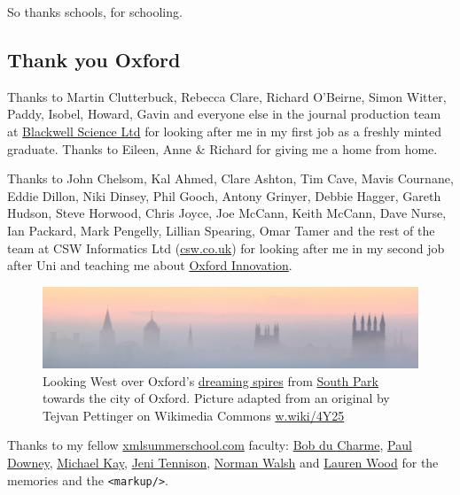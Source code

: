 \documentclass[
]{book}
\begin{document}
So thanks schools, for schooling. 🙏

\hypertarget{oxford}{%
\subsection{Thank you Oxford}\label{oxford}}

Thanks to Martin Clutterbuck, Rebecca Clare, Richard O'Beirne, Simon Witter, Paddy, Isobel, Howard, Gavin and everyone else in the journal production team at \href{https://www.flickr.com/photos/dullhunk/4042838703}{Blackwell Science Ltd} for looking after me in my first job as a freshly minted graduate. Thanks to Eileen, Anne \& Richard for giving me a home from home.

Thanks to John Chelsom, Kal Ahmed, Clare Ashton, Tim Cave, Mavis Cournane, Eddie Dillon, Niki Dinsey, Phil Gooch, Antony Grinyer, Debbie Hagger, Gareth Hudson, Steve Horwood, Chris Joyce, Joe McCann, Keith McCann, Dave Nurse, Ian Packard, Mark Pengelly, Lillian Spearing, Omar Tamer and the rest of the team at CSW Informatics Ltd (\href{https://csw.co.uk/}{csw.co.uk}) for looking after me in my second job after Uni and teaching me about \href{https://oxin-centres.co.uk/}{Oxford Innovation}.

\begin{figure}

{\centering \includegraphics[width=1\linewidth]{images/dreaming-spires-oxford-sunrise} 

}

\caption{Looking West over Oxford's \href{https://en.wikipedia.org/wiki/Thyrsis_(poem)}{dreaming spires} from \href{https://en.wikipedia.org/wiki/South_Park,_Oxford}{South Park} towards the city of Oxford. Picture adapted from an original by Tejvan Pettinger on Wikimedia Commons \href{https://w.wiki/4Y25}{w.wiki/4Y25}}\label{fig:oxford-fig}
\end{figure}

Thanks to my fellow \href{https://xmlsummerschool.com/}{xmlsummerschool.com} faculty: \href{https://www.bobdc.com/blog/}{Bob du Charme}, \href{https://twitter.com/psd}{Paul Downey}, \href{https://en.wikipedia.org/wiki/Michael_Howard_Kay}{Michael Kay}, \href{https://en.wikipedia.org/wiki/Jeni_Tennison}{Jeni Tennison}, \href{https://norman.walsh.name/}{Norman Walsh} and \href{https://www.laurenwood.org/}{Lauren Wood} for the memories and the \texttt{\textless{}markup/\textgreater{}}.
\end{document}
